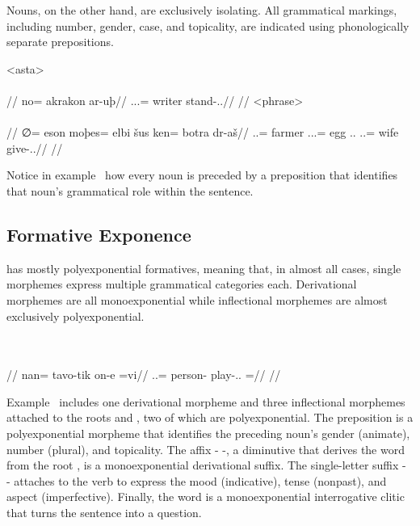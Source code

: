 Nouns, on the other hand, are exclusively isolating. All grammatical markings, including number, gender, case, and topicality, are indicated using phonologically separate prepositions.

	\a<asta>\begingl
		\glpreamble{}\\
		\\
		//
		\gla no= akrakon ar-uþ//
		\glb \An.\Sg.\Top.\Abs= writer stand-\Ind.\Npst.\Prg//
		\glft{}//
	\endgl
	\a<phrase>\begingl
		\glpreamble{}\\
		\\
		//
		\gla ∅= eson moþes= elbi šus ken= botra dr-aš//
		\glb \An.\Sg.\Abs= farmer \In.\Pc.\Top.\Acc= egg \Tps.\An.\Gen{} \An.\Pl.\Dat= wife give-\Ind.\Npst.\Rtsp//
		\glft{}//
	\endgl
\xe

Notice in example~ how every noun is preceded by a preposition that identifies that noun's grammatical role within the sentence.


\subsection{Formative Exponence}
\label{subsec:tvk-exponence}

\langtvk{} has mostly polyexponential formatives, meaning that, in almost all cases, single morphemes express multiple grammatical categories each\autocite{wals-21}. Derivational morphemes are all monoexponential while inflectional morphemes are almost exclusively polyexponential.

	\begingl
		\glpreamble{}\\
		\\
		//
		\gla nan= tavo-tik on-e =vi//
		\glb \An.\Pl.\Top= person-\Dim{} play-\Ind.\Npst.\Ipfv{} =\Q//
		\glft{}//
	\endgl
\xe

Example~ includes one derivational morpheme and three inflectional morphemes attached to the roots   and  , two of which are polyexponential. The preposition   is a polyexponential morpheme that identifies the preceding noun's gender (animate), number (plural), and topicality. The affix - -, a diminutive that derives the word  from the root , is a monoexponential derivational suffix. The single-letter suffix - - attaches to the verb to express the mood (indicative), tense (nonpast), and aspect (imperfective). Finally, the word   is a monoexponential interrogative clitic that turns the sentence into a question.

